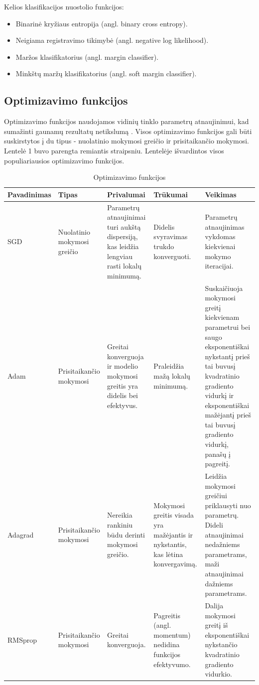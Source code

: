 \documentclass{VUMIFPSbakalaurinis}
\begin{document}
Kelios klasifikacijos nuostolio funkcijos:
\begin{itemize}
\item Binarinė kryžiaus entropija (angl. binary cross entropy).
\item Neigiama registravimo tikimybė (angl. negative log likelihood).
\item Maržos klasifikatorius (angl. margin classifier).
\item Minkštų maržų klasifikatorius (angl. soft margin classifier).
\end{itemize}

\subsection{Optimizavimo funkcijos}
Optimizavimo funkcijos naudojamos vidinių tinklo parametrų atnaujinimui, kad sumažinti gaunamų rezultatų netikslumą \cite{Niknafs2016NeuralNO}. 
Visos optimizavimo funkcijos gali būti suskirstytos į du tipus - nuolatinio mokymosi greičio ir prisitaikančio mokymosi. 
Lentelė 1 buvo parengta remiantis \cite{DBLP:journals/corr/Ruder16} straipsniu. Lentelėje išvardintos visos populiariausios optimizavimo funkcijos.

\begin{longtable}[h!]{ | p{2cm} | p{2.2cm} | p{2.5cm} | p{2.5cm} | p{4.5cm} | } 
\caption{Optimizavimo funkcijos} \\ \hline
Pavadinimas & Tipas & Privalumai & Trūkumai & Veikimas \\ \hline
\endhead
SGD & Nuolatinio mokymosi greičio & Parametrų atnaujinimai turi aukštą dispersiją, kas leidžia lengviau rasti lokalų minimumą. & Didelis svyravimas trukdo konverguoti. & Parametrų atnaujinimas vykdomas kiekvienai mokymo iteracijai. \\ \hline
Adam & Prisitaikančio mokymosi & Greitai konverguoja ir modelio mokymosi greitis yra didelis bei efektyvus. & Praleidžia mažą lokalų minimumą. & Suskaičiuoja mokymosi greitį kiekvienam parametrui bei saugo eksponentiškai nykstantį prieš tai buvusį kvadratinio gradiento vidurkį ir eksponentiškai mažėjantį prieš tai buvusį gradiento vidurkį, panašų į pagreitį. \\ \hline
Adagrad & Prisitaikančio mokymosi & Nereikia rankiniu būdu derinti mokymosi greičio. & Mokymosi greitis visada yra mažėjantis ir nykstantis, kas lėtina konvergavimą. & Leidžia mokymosi greičiui priklausyti nuo parametrų. Dideli atnaujinimai nedažniems parametrams, maži atnaujinimai dažniems parametrams. \\ \hline
RMSprop & Prisitaikančio mokymosi & Greitai konverguoja. & Pagreitis (angl. momentum) nedidina funkcijos efektyvumo. & Dalija mokymosi greitį iš eksponentiškai nykstančio kvadratinio gradiento vidurkio. \\ \hline
\end{longtable}
\end{document}
